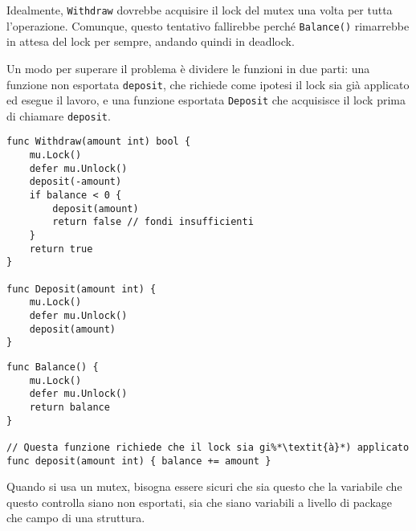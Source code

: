 \documentclass[../../thesis.tex]{subfiles}
\begin{document}
    Idealmente, \verb"Withdraw" dovrebbe acquisire il lock del mutex una volta per tutta l'operazione.
    Comunque, questo tentativo fallirebbe perché \verb"Balance()" rimarrebbe in attesa del lock per sempre, andando quindi in deadlock.
    \hfill \vspace{12pt}

    Un modo per superare il problema è dividere le funzioni in due parti: una funzione non esportata \verb"deposit", che richiede come ipotesi il lock sia già applicato ed esegue il lavoro, e una funzione esportata \verb"Deposit" che acquisisce il lock prima di chiamare \verb"deposit".
    \begin{lstlisting}[frame = single, label = {lst:lstlisting9-2.6}]
func Withdraw(amount int) bool {
    mu.Lock()
    defer mu.Unlock()
    deposit(-amount)
    if balance < 0 {
        deposit(amount)
        return false // fondi insufficienti
    }
    return true
}

func Deposit(amount int) {
    mu.Lock()
    defer mu.Unlock()
    deposit(amount)
}
    \end{lstlisting}
    \clearpage
    \newpage
    \begin{lstlisting}[frame = single, label = {lst:lstlisting9-2.7}]
func Balance() {
    mu.Lock()
    defer mu.Unlock()
    return balance
}

// Questa funzione richiede che il lock sia gi%*\textit{à}*) applicato
func deposit(amount int) { balance += amount }
    \end{lstlisting}
    Quando si usa un mutex, bisogna essere sicuri che sia questo che la variabile che questo controlla siano non esportati, sia che siano variabili a livello di package che campo di una struttura.
\end{document}
